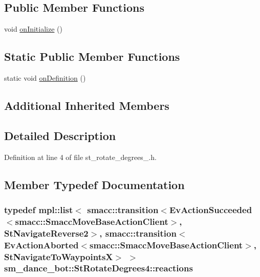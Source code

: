 \subsection*{Public Member Functions}
\begin{DoxyCompactItemize}
\item 
void \hyperlink{structsm__dance__bot_1_1StRotateDegrees4_a10d912862ef26c747bc10f7539dc8027}{on\+Initialize} ()
\end{DoxyCompactItemize}
\subsection*{Static Public Member Functions}
\begin{DoxyCompactItemize}
\item 
static void \hyperlink{structsm__dance__bot_1_1StRotateDegrees4_ac0484e835c340cb9d7632ed1fe349b0b}{on\+Definition} ()
\end{DoxyCompactItemize}
\subsection*{Additional Inherited Members}


\subsection{Detailed Description}


Definition at line 4 of file st\+\_\+rotate\+\_\+degrees\+\_.\+h.



\subsection{Member Typedef Documentation}
\subsubsection[{\texorpdfstring{reactions}{reactions}}]{\setlength{\rightskip}{0pt plus 5cm}typedef mpl\+::list$<$ {\bf smacc\+::transition}$<$Ev\+Action\+Succeeded$<${\bf smacc\+::\+Smacc\+Move\+Base\+Action\+Client}$>$, {\bf St\+Navigate\+Reverse2}$>$, {\bf smacc\+::transition}$<$Ev\+Action\+Aborted$<${\bf smacc\+::\+Smacc\+Move\+Base\+Action\+Client}$>$, {\bf St\+Navigate\+To\+WaypointsX}$>$ $>$ {\bf sm\+\_\+dance\+\_\+bot\+::\+St\+Rotate\+Degrees4\+::reactions}}\hypertarget{structsm__dance__bot_1_1StRotateDegrees4_a6ea157907b088ed4840f610d659b541b}{}\label{structsm__dance__bot_1_1StRotateDegrees4_a6ea157907b088ed4840f610d659b541b}


